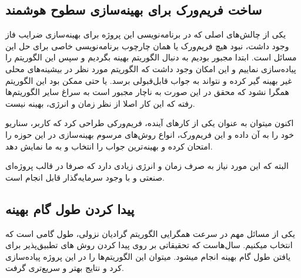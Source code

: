 \subsection{ساخت فریم‌ورک برای بهینه‌سازی سطوح هوشمند}
یکی از چالش‌های اصلی که در برنامه‌نویسی این پروژه برای بهینه‌سازی ضرایب فاز وجود داشت، نبود هیچ فریم‌ورک یا همان چارچوب برنامه‌نویسی خاصی برای حل این مسائل است. ابتدا مجبور بودیم به دنبال الگوریتم بهینه بگردیم و سپس این الگوریتم را پیاده‌سازی نماییم و این امکان وجود داشت که الگوریتم مورد نظر در بیشینه‌های محلی غیر بهینه گیر کرده و نتواند به جواب قابل‌قبولی برسد. یا حتی ممکن بود این الگوریتم همگرا نشود که محقق در این صورت به ناچار مجبور است به سراغ سایر الگوریتم‌ها رفته که این کار اصلا از نظر زمان و انرژی، بهینه نیست.

اکنون میتوان به عنوان یکی از کارهای آینده، فریم‌ورکی طراحی کرد که کاربر، سناریو خود را به آن داده و این فریم‌ورک، انواع روش‌های مرسوم بهینه‌سازی در این حوزه را امتحان کرده و بهینه‌ترین جواب را انتخاب و به ما نمایش دهد.

البته که این مورد نیاز به صرف زمان و انرژی زیادی دارد که صرفا در قالب پروژه‌ای صنعتی و با وجود سرمایه‌گذار قابل انجام است.

\subsection{پیدا کردن طول گام بهینه}
یکی از مسائل مهم در سرعت همگرایی الگوریتم گرادیان نزولی، طول گامی است که انتخاب میکنیم. سال‌هاست که تحقیقاتی بر روی پیدا کردن روش های تطبیق‌پذیر برای یافتن طول گام بهینه انجام میشود. میتوان این الگوریتم‌ها را در این پروژه پیاده‌سازی کرد و نتایج بهتر و سریع‌تری گرفت. 
\newpage
‌